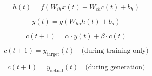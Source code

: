 
\begin{equation}
h(t) = f\left( W_{ih} x(t) + W_{ch} c(t) + b_h \right)
\end{equation}

\begin{equation}
y(t) = g\left( W_{ho} h(t) + b_o \right)
\end{equation}

\begin{equation}
c(t+1) = \alpha \cdot y(t) + \beta \cdot c(t)
\end{equation}

\begin{equation}
c(t+1) = y_{\text{target}}(t) \quad \text{(during training only)}
\end{equation}

\begin{equation}
c(t+1) = y_{\text{actual}}(t) \quad \text{(during generation)}
\end{equation}